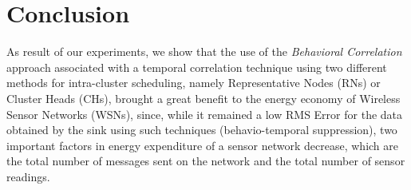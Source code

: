 \documentclass[conference]{IEEEtran}
\begin{document}
\section{Conclusion}

As result of our experiments, we show that the use of the \textit{Behavioral
Correlation} approach associated with a temporal correlation technique using two
different methods for intra-cluster scheduling, namely Representative Nodes
(RNs) or Cluster Heads (CHs), brought a great benefit to the energy economy of
Wireless Sensor Networks (WSNs), since, while it remained a low RMS Error for
the data obtained by the sink using such techniques (behavio-temporal
suppression), two important factors in energy expenditure of a sensor network
decrease, which are the total number of messages sent on the network and the
total number of sensor readings.






  
\end{document}

